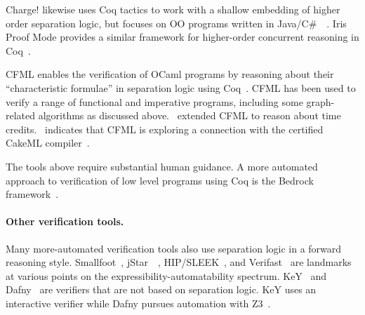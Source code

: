 Charge! likewise uses Coq tactics to work with a shallow embedding of higher 
order separation logic, but focuses on OO programs written in 
Java/C\#~~\cite{bengtson:charge}. Iris Proof Mode provides a similar framework 
for higher-order concurrent reasoning in Coq~\cite{krebbers:iris}.

CFML enables the verification of OCaml programs by reasoning about their
 “characteristic formulae” in separation logic using Coq~\cite{char10, char11}. 
CFML has been used to verify a range of functional and imperative programs,
including some graph-related algorithms as discussed 
above. \cite{charpott15, charpott19}~extended CFML to reason about time 
credits. \cite{gueneau17}~indicates that CFML is exploring a connection 
with the certified CakeML compiler~\cite{cakeml}.

The tools above require substantial human guidance. A more automated approach to verification of low level programs using Coq is the Bedrock framework~\cite{chlipala:bedrock}.


\paragraph{Other verification tools.} 

Many more-automated verification tools also use separation logic in a forward
reasoning style. Smallfoot~\cite{berdine:smallfoot}, jStar~~\cite{distefanop08}, 
HIP/SLEEK~\cite{chin:hipsleek}, and Verifast~\cite{jacobs:verifast} are landmarks
at various points on the expressibility-automatability spectrum. 
KeY~\cite{beckert:2007} and Dafny~\cite{leino10} are verifiers that are not 
based on separation logic. KeY uses an interactive verifier while Dafny pursues
 automation with Z3~\cite{moura2008}.

